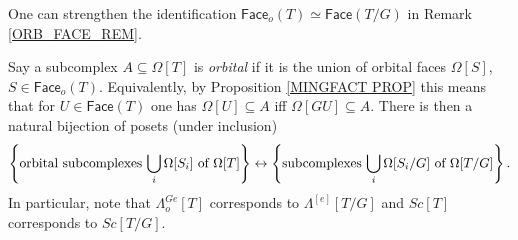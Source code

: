 \documentclass[a4paper,10pt
]{article}%
\begin{document}
\begin{remark}\label{ORB_HORN_REM}
One can strengthen the identification 
$\mathsf{Face}_o(T) \simeq \mathsf{Face}(T/G)$
in Remark \ref{ORB_FACE_REM}.

Say a subcomplex $A \subseteq \Omega[T]$ is \textit{orbital}
if it is the union of orbital faces $\Omega[S]$, $S\in \mathsf{Face}_o(T)$. 
Equivalently, by Proposition \ref{MINGFACT PROP} this means that for $U \in \mathsf{Face}(T)$
one has $\Omega[U] \subseteq A$ iff $\Omega[GU] \subseteq A$. There is then a natural bijection 
of posets (under inclusion)
\begin{equation}
	\left\{
	\text{orbital subcomplexes $\bigcup_i\Omega[S_i]$ of $\Omega[T]$}\right\}
		\leftrightarrow
	\left\{\text{subcomplexes $\bigcup_i\Omega[S_i/G]$ of $\Omega[T/G]$}\right\}.
\end{equation}
In particular, note that $\Lambda^{Ge}_o[T]$ corresponds to $\Lambda^{[e]}[T/G]$
and $Sc[T]$ corresponds to $Sc[T/G]$.
\end{remark}
\end{document}
